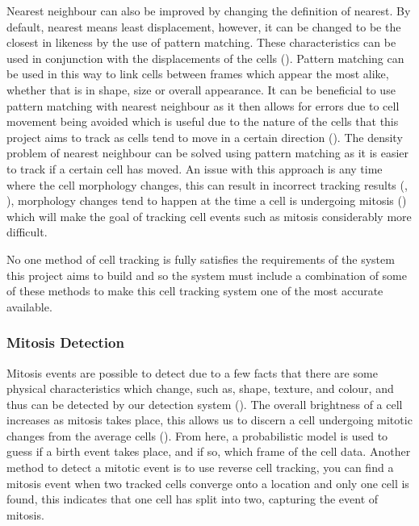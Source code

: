 \documentclass[12pt a4paper]{article}
\begin{document}
        Nearest neighbour can also be improved by changing the definition of nearest. By default, nearest means least displacement, however, it can be changed to be the closest in likeness by the use of pattern matching. These characteristics can be used in conjunction with the displacements of the cells (\cite{handetal}). Pattern matching can be used in this way to link cells between frames which appear the most alike, whether that is in shape, size or overall appearance. It can be beneficial to use pattern matching with nearest neighbour as it then allows for errors due to cell movement being avoided which is useful due to the nature of the cells that this project aims to track as cells tend to move in a certain direction (\cite{miura_2005}). The density problem of nearest neighbour can be solved using pattern matching as it is easier to track if a certain cell has moved. An issue with this approach is any time where the cell morphology changes, this can result in incorrect tracking results (\cite{handetal}, \cite{thirusittampalam}), morphology changes tend to happen at the time a cell is undergoing mitosis (\cite{Hamahashi2005}) which will make the goal of tracking cell events such as mitosis considerably more difficult.
        
        
        No one method of cell tracking is fully satisfies the requirements of the system this project aims to build and so the system must include a combination of some of these methods to make this cell tracking system one of the most accurate available.
        \subsubsection{Mitosis Detection}
        Mitosis events are possible to detect due to a few facts that there are some physical characteristics which change, such as, shape, texture, and colour, and thus can be detected by our detection system (\cite{irshad2013automated}). The overall brightness of a cell increases as mitosis takes place, this allows us to discern a cell undergoing mitotic changes from the average cells (\cite{huh-et-al}). From here, a probabilistic model is used to guess if a birth event takes place, and if so, which frame of the cell data.
        Another method to detect a mitotic event is to use reverse cell tracking, you can find a mitosis event when two tracked cells converge onto a location and only one cell is found, this indicates that one cell has split into two, capturing the event of mitosis.
        
\end{document}
